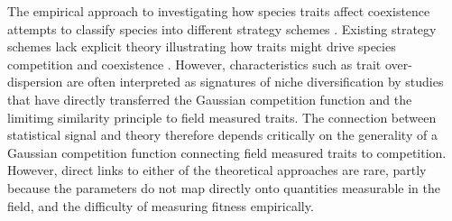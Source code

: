 \documentclass[a4paper,11pt]{article}
\begin{document}
The empirical approach to investigating how species traits affect
coexistence attempts to classify species into different strategy
schemes
\citep{Grime-1974,Grime-1979,Southwood-1977,Weiher-1999,Westoby-2002}.
%
%
Existing strategy schemes lack explicit theory illustrating how traits
might drive species competition and coexistence \citep{Adler-2013}.
However, characteristics such as trait over-dispersion are often
interpreted as
signatures of niche diversification \citep[e.g.][]{Kraft-2008} by
 studies that have directly transferred the Gaussian competition function and the limitimg similarity principle  to field measured traits.
The connection between statistical signal and theory therefore depends
critically on the generality of a Gaussian competition function
connecting field measured traits to competition.
%
However, direct links to either of the theoretical approaches are
rare, partly because the parameters do not map directly onto
quantities measurable in the field, and the difficulty of measuring
fitness empirically.
\end{document}
